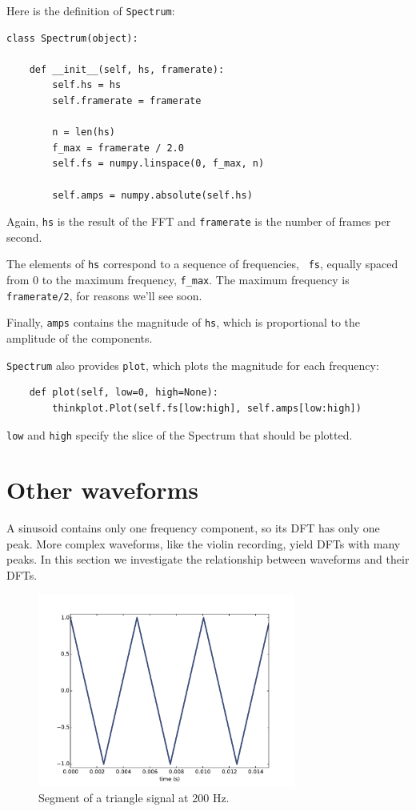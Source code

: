 \documentclass[12pt]{book}
\begin{document}
Here is the definition of {\tt Spectrum}:

\begin{verbatim}
class Spectrum(object):

    def __init__(self, hs, framerate):
        self.hs = hs
        self.framerate = framerate

        n = len(hs)
        f_max = framerate / 2.0
        self.fs = numpy.linspace(0, f_max, n)

        self.amps = numpy.absolute(self.hs)
\end{verbatim}

Again, {\tt hs} is the result of the FFT and {\tt framerate}
is the number of frames per second.

The elements of {\tt hs} correspond to a sequence of frequencies, {\tt
  fs}, equally spaced from 0 to the maximum frequency, \verb"f_max".
The maximum frequency is {\tt framerate/2}, for reasons we'll see
soon.

Finally, {\tt amps} contains the magnitude of {\tt hs}, which
is proportional to the amplitude of the components.

{\tt Spectrum} also provides {\tt plot}, which plots the magnitude for each
frequency:

\begin{verbatim}
    def plot(self, low=0, high=None):
        thinkplot.Plot(self.fs[low:high], self.amps[low:high])
\end{verbatim}

{\tt low} and {\tt high} specify the slice of the Spectrum that
should be plotted.


\section{Other waveforms}

A sinusoid contains only one frequency component, so its DFT
has only one peak.  More complex waveforms, like the
violin recording, yield DFTs with many peaks.  In this section we
investigate the relationship between waveforms and their DFTs.

\begin{figure}
\centerline{\includegraphics[height=2.5in]{figs/triangle-200-1.pdf}}
\caption{Segment of a triangle signal at 200 Hz.}
\label{fig.triangle.200.1}
\end{figure}
\end{document}
